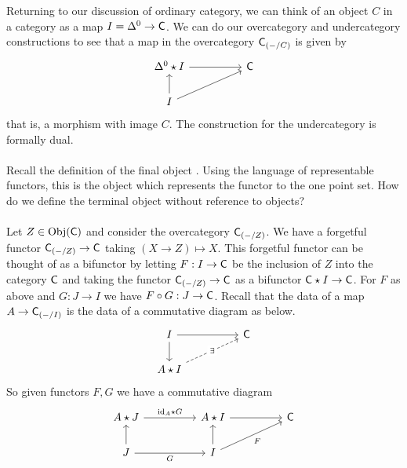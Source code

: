 Returning to our discussion of ordinary category, we can think of an object $C$ in a category as a map $I=\Delta^{0}\to\mathsf{C}$. We can do our overcategory and undercategory constructions to see that a map in the overcategory $\mathsf{C}_{(-/C)}$ is given by 
$$%
\begin{tikzcd}
	{\Delta^{0}\star I} && \Csf \\
	I
	\arrow[from=1-1, to=1-3]
	\arrow[from=2-1, to=1-1]
	\arrow[from=2-1, to=1-3]
\end{tikzcd}$$
that is, a morphism with image $C$. The construction for the undercategory is formally dual. 
\\\\
Recall the definition of the final object . Using the language of representable functors, this is the object which represents the functor to the one point set. How do we define the terminal object without reference to objects? \\\\
Let $Z\in\mathrm{Obj}(\mathsf{C})$ and consider the overcategory $\mathsf{C}_{(-/Z)}$. We have a forgetful functor $\mathsf{C}_{(-/Z)}\to\mathsf{C}$ taking $(X\to Z)\mapsto X$. This forgetful functor can be thought of as a bifunctor by letting $F:I\to\mathsf{C}$ be the inclusion of $Z$ into the category $\mathsf{C}$ and taking the functor $\mathsf{C}_{(-/Z)}\to\mathsf{C}$ as a bifunctor $\mathsf{C}\star I\to \mathsf{C}$. For $F$ as above and $G:J\to I$ we have $F\circ G:J\to\mathsf{C}$. Recall that the data of a map $A\to\mathsf{C}_{(-/I)}$ is the data of a commutative diagram as below.  
$$%
\begin{tikzcd}
	I && \Csf \\
	{A\star I}
	\arrow[from=1-1, to=2-1]
	\arrow["\exists"{description}, dashed, from=2-1, to=1-3]
	\arrow[from=1-1, to=1-3]
\end{tikzcd}$$
So given functors $F,G$ we have a commutative diagram 
$$%
\begin{tikzcd}
	{A\star J} && {A\star I} && \Csf \\
	J && I
	\arrow["{\id_{A}\star G}", from=1-1, to=1-3]
	\arrow[from=1-3, to=1-5]
	\arrow["F"', from=2-3, to=1-5]
	\arrow[from=2-3, to=1-3]
	\arrow[from=2-1, to=1-1]
	\arrow["G"', from=2-1, to=2-3]
\end{tikzcd}$$
